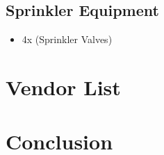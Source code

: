 \documentclass[letterpaper, 10 pt, conference]{ieeeconf}  %
\begin{document}
\subsection{Sprinkler Equipment}
\begin{itemize}
  \item 4x (Sprinkler Valves)
\end{itemize}

\section{Vendor List}

\section{Conclusion}

\begin{thebibliography}{99}
\end{thebibliography}
\end{document}
